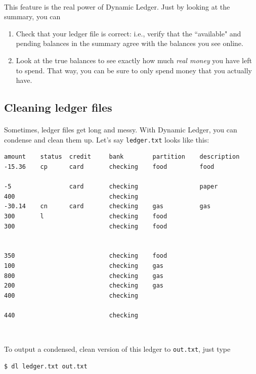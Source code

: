 \documentclass{article}
\providecommand{\q}{$\quad$ \newline}
\begin{document}
\begin{flushleft}
\paragraph{} This feature is the real power of Dynamic Ledger. Just by looking at the summary, you can

\begin{enumerate}
\item Check that your ledger file is correct: i.e., verify that the ``available" and pending balances in the summary agree with the balances you see online.
\item Look at the true balances to see exactly how much \emph{real money} you have left to spend. That way, you can be sure to only spend money that you actually have.
\end{enumerate}

\clearpage

\subsection{Cleaning ledger files}

\paragraph{} Sometimes, ledger files get long and messy. With Dynamic Ledger, you can condense and clean them up. Let's say {\tt ledger.txt} looks like this: 

\begin{lstlisting}[title=ledger.txt]
amount    status  credit     bank        partition    description
-15.36    cp      card       checking    food         food

-5                card       checking                 paper
400                          checking
-30.14    cn      card       checking    gas          gas
300       l                  checking    food
300                          checking    food


350                          checking    food
100                          checking    gas
800                          checking    gas
200                          checking    gas
400                          checking

440                          checking
\end{lstlisting} \q

To output a condensed, clean version of this ledger to {\tt out.txt}, just type \q

\begin{lstlisting}
$ dl ledger.txt out.txt
\end{lstlisting} 


\end{flushleft}
\end{document}
